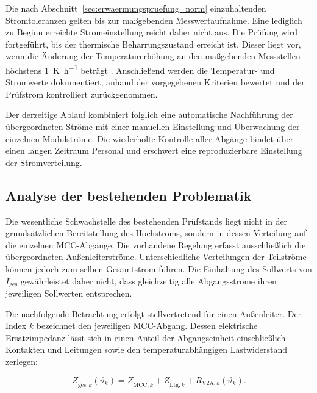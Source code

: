 Die nach Abschnitt~\ref{sec:erwaermungspruefung_norm} einzuhaltenden
Stromtoleranzen gelten bis zur maßgebenden Messwertaufnahme. Eine lediglich
zu Beginn erreichte Stromeinstellung reicht daher nicht aus. Die Prüfung wird
fortgeführt, bis der thermische Beharrungszustand erreicht ist. Dieser liegt
vor, wenn die Änderung der Temperaturerhöhung an den maßgebenden Messstellen
höchstens \SI{1}{\kelvin\per\hour} beträgt
\parencite[Abschn.~10.10.2.3.1]{din_en_61439_1}. Anschließend werden die
Temperatur- und Stromwerte dokumentiert, anhand der vorgegebenen Kriterien
bewertet und der Prüfstrom kontrolliert zurückgenommen.

Der derzeitige Ablauf kombiniert folglich eine automatische Nachführung der
übergeordneten Ströme mit einer manuellen Einstellung und Überwachung der
einzelnen Modulströme. Die wiederholte Kontrolle aller Abgänge bindet über
einen langen Zeitraum Personal und erschwert eine reproduzierbare
Einstellung der Stromverteilung.


\subsection{Analyse der bestehenden Problematik}
\label{sec:analyse_problematik}

Die wesentliche Schwachstelle des bestehenden Prüfstands liegt nicht in der
grundsätzlichen Bereitstellung des Hochstroms, sondern in dessen Verteilung
auf die einzelnen MCC-Abgänge. Die vorhandene Regelung erfasst ausschließlich
die übergeordneten Außenleiterströme. Unterschiedliche Verteilungen der
Teilströme können jedoch zum selben Gesamtstrom führen. Die Einhaltung des
Sollwerts von \(I_\mathrm{ges}\) gewährleistet daher nicht, dass gleichzeitig
alle Abgangsströme ihren jeweiligen Sollwerten entsprechen.

Die nachfolgende Betrachtung erfolgt stellvertretend für einen Außenleiter.
Der Index \(k\) bezeichnet den jeweiligen MCC-Abgang. Dessen elektrische
Ersatzimpedanz lässt sich in einen Anteil der Abgangseinheit einschließlich
Kontakten und Leitungen sowie den temperaturabhängigen Lastwiderstand
zerlegen:

\begin{equation}
    \underline{Z}_{\mathrm{ges},k}(\vartheta_k)
    =
    \underline{Z}_{\mathrm{MCC},k}
    +
    \underline{Z}_{\mathrm{Ltg},k}
    +
    R_{\mathrm{V2A},k}(\vartheta_k).
    \label{eq:ist_gesamtimpedanz_abgang}
\end{equation}

